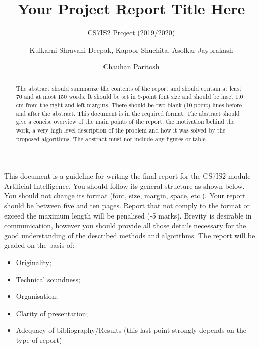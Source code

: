 \documentclass{svproc}
\begin{document}
\mainmatter
\title{Your Project Report Title Here
}
\subtitle{CS7IS2 Project (2019/2020)}
\author{Kulkarni Shravani Deepak, Kapoor Shuchita, Asolkar Jayprakash \and Chauhan Paritosh}


\maketitle              %

\begin{abstract}
The abstract should summarize the contents of the report and should contain at least 70 and at most 150 words. It should be set in 9-point font size and should be inset 1.0 cm from the right and left margins. There should be two blank (10-point) lines before and after the abstract. This document is in the required format. The abstract should give a concise overview of the main points of the report: the motivation behind the work, a very high level description of the problem and how it was solved by the proposed algorithms. The abstract must not include any figures or table.
\end{abstract}
%

This document is a guideline for writing the final report for the CS7IS2 module Artificial Intelligence. You should follow its general structure as shown below.
You should not change its format (font, size, margin, space, etc.). 
Your report should be between five and ten pages. Report that not comply to the format or exceed the maximum length will be penalised (-5 marks).
Brevity is desirable in communication, however you should provide all those details necessary for the good understanding of the described methods and algorithms. 
The report will be graded on the basis of:
\begin{itemize}
\item Originality;
\item Technical soundness;
\item Organisation;
\item Clarity of presentation;
\item Adequacy of bibliography/Results (this last point strongly depends on the type of report)
\end{itemize}
\end{document}
